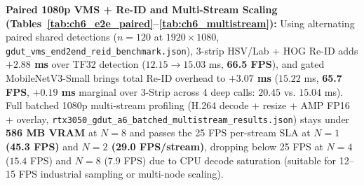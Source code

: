 \FloatBarrier
\noindent\textbf{Paired 1080p VMS + Re-ID and Multi-Stream Scaling (Tables~\ref{tab:ch6_e2e_paired}--\ref{tab:ch6_multistream}):} Using alternating paired shared detections ($n=120$ at $1920\times 1080$, \nolinkurl{gdut_vms_end2end_reid_benchmark.json}), 3-strip HSV/Lab + HOG Re-ID adds \textbf{$+2.88$ ms} over TF32 detection ($12.15 \to 15.03$ ms, \textbf{66.5 FPS}), and gated MobileNetV3-Small brings total Re-ID overhead to \textbf{$+3.07$ ms} ($15.22$ ms, \textbf{65.7 FPS}, \textbf{$+0.19$ ms} marginal over 3-Strip across 4 deep calls: $20.45$ vs. $15.04$ ms). Full batched 1080p multi-stream profiling (H.264 decode + resize + AMP FP16 + overlay, \nolinkurl{rtx3050_gdut_a6_batched_multistream_results.json}) stays under \textbf{586 MB VRAM} at $N=8$ and passes the 25 FPS per-stream SLA at \textbf{$N=1$ (45.3 FPS)} and \textbf{$N=2$ (29.0 FPS/stream)}, dropping below 25 FPS at $N=4$ ($15.4$ FPS) and $N=8$ ($7.9$ FPS) due to CPU decode saturation (suitable for 12--15 FPS industrial sampling or multi-node scaling).

\begin{table}[htbp]
\centering
\caption{Five-Tier Paired End-to-End 1080p VMS + Non-Biometric Re-ID Benchmark on RTX 3050 (\texttt{21866da3 $\to$ d422dd1d}, \nolinkurl{gdut_vms_end2end_reid_benchmark.json}).}
\label{tab:ch6_e2e_paired}
\end{table}

